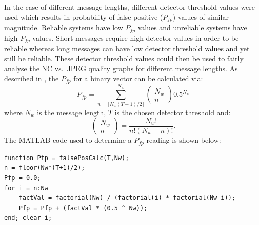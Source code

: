 \documentclass[12pt]{report}
\renewcommand{\baselinestretch}{1.5}
\begin{document}
In the case of different message lengths, different detector threshold values were used which results in 
probability of false positive ($P_{\mathit fp}$) values of similar magnitude.
Reliable systems have low $P_{\mathit fp}$ values and unreliable systems have high $P_{\mathit fp}$ values.
Short messages require high detector values in order to be reliable 
whereas long messages can have low detector threshold values and yet still be reliable. 
These detector threshold values could then be used to fairly analyse the NC vs.~JPEG
quality graphs 
for different message lengths.
As described in \cite{kundurPfpDI}, the $P_{fp}$ for a binary vector can be calculated via:
\begin{equation}
\label{eq:PfpBKX}
        P_{fp} = \sum^{N_{w}}_{n= \lceil N_{w}(T+1)/2 \rceil} \left(
                                                                        \begin{array}{c}
                                                                                N_{w} \\
                                                                                n
                                                                        \end{array}
                                                              \right)                           0.5^{N_{w}}
\end{equation}
where $N_{w}$ is the message length, $T$ is the chosen detector threshold and:
\begin{equation} 
\label{eq:PfpBKX_2}
								\left(
                                                                        \begin{array}{c}
                                                                                N_{w} \\
                                                                                n
                                                                        \end{array}
                                                              	\right)				=  	\frac{N_{w}!}{n!(N_{w}-n)!}.
\end{equation} 
The MATLAB code used to determine a $P_{fp}$ reading is shown below:
\footnotesize
\renewcommand{\baselinestretch}{1}
\begin{verbatim}
function Pfp = falsePosCalc(T,Nw);
n = floor(Nw*(T+1)/2);
Pfp = 0.0;
for i = n:Nw
    factVal = factorial(Nw) / (factorial(i) * factorial(Nw-i));
    Pfp = Pfp + (factVal * (0.5 ^ Nw));
end; clear i;
\end{verbatim}
\renewcommand{\baselinestretch}{1.5}
\normalsize
\end{document}
